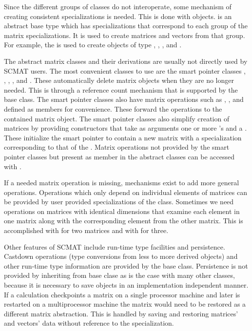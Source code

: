 Since the different groups of classes do not interoperate, some mechanism
of creating consistent specializations is needed.  This is done with
 objects.   is an abstract base
type which has specializations that correspond to each group of the matrix
specializations.  It is used to create matrices and vectors from that
group.  For example, the  is used to create
objects of type , ,
, and .

The abstract matrix classes and their derivations are usually not directly
used by SCMAT users.  The most convenient classes to use are the smart
pointer classes , ,
, , and
.  These automatically delete matrix objects when
they are no longer needed.  This is through a reference count mechanism
that is supported by the  base class.  The smart
pointer classes also have matrix operations such as , , and  defined as
members for convenience.  These forward the operations to the contained
matrix object.  The smart pointer classes also simplify creation of
matrices by providing constructors that take as arguments one or more
's and a .  These
initialize the smart pointer to contain a new matrix with a specialization
corresponding to that of the .  Matrix operations
not provided by the smart pointer classes but present as member in the
abstract classes can be accessed with .

If a needed matrix operation is missing, mechanisms exist to add more
general operations.  Operations which only depend on individual elements of
matrices can be provided by user provided specializations of the
 class.  Sometimes we need operations on matrices
with identical dimensions that examine each element in one matrix along
with the corresponding element from the other matrix.  This is accomplished
with  for two matrices and with
 for three.

Other features of SCMAT include run-time type facilities and persistence.
Castdown operations (type conversions from less to more derived objects)
and other run-time type information are provided by the
 base class.  Persistence is not provided by
inheriting from  base clase as is the case with many
other classes, because it is necessary to save objects in an implementation
independent manner.  If a calculation checkpoints a matrix on a single
processor machine and later is restarted on a multiprocessor machine the
matrix would need to be restored as a different matrix abstraction.  This
is handled by saving and restoring matrices' and vectors' data without
reference to the specialization.

